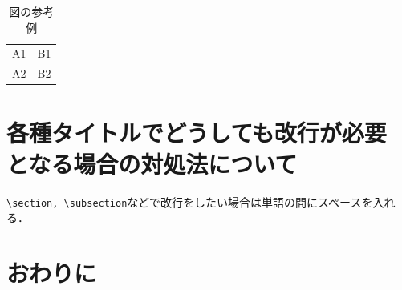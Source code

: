 \documentclass[b5paper, 9pt, twocolumn, titlepage]{jsbook}
\begin{document}
\begin{table}[tbh]
 \begin{center}
  \begin{tabular}{|l|r|} \hline
  A1 & B1 \\
  A2 & B2 \\ \hline
  \end{tabular}
  \caption{図の参考例}
  \label{table:sample}
 \end{center}
\end{table}

\section{各種タイトルでどうしても改行が必要 となる場合の対処法について}

\verb|\section, \subsection|などで改行をしたい場合は単語の間にスペースを入れる．

\section{おわりに}







\end{document}
